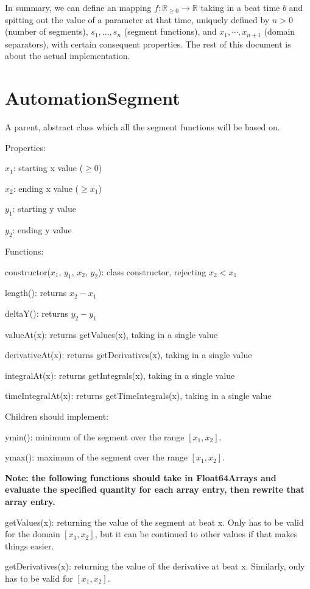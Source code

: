 \documentclass{article}
\begin{document}
In summary, we can define an mapping $f:\mathbb{R}_{\geq 0}\to \mathbb{R}$ taking in a beat time $b$ and spitting out the value of a parameter at that time, uniquely defined by $n>0$ (number of segments), $s_1, ..., s_n$ (segment functions), and $x_1, \cdots, x_{n+1}$ (domain separators), with certain consequent properties. The rest of this document is about the actual implementation.

\section{AutomationSegment}

A parent, abstract class which all the segment functions will be based on.

Properties:

$x_1$: starting x value ($\geq 0$)

$x_2$: ending x value ($\geq x_1$)

$y_1$: starting y value

$y_2$: ending y value

Functions:

constructor($x_1$, $y_1$, $x_2$, $y_2$): class constructor, rejecting $x_2 < x_1$

length(): returns $x_2 - x_1$

deltaY(): returns $y_2 - y_1$

valueAt(x): returns getValues(x), taking in a single value

derivativeAt(x): returns getDerivatives(x), taking in a single value

integralAt(x): returns getIntegrals(x), taking in a single value

timeIntegralAt(x): returns getTimeIntegrals(x), taking in a single value

Children should implement:

ymin(): minimum of the segment over the range $[x_1, x_2]$.

ymax(): maximum of the segment over the range $[x_1, x_2]$.

\textbf{Note: the following functions should take in Float64Arrays and evaluate the specified quantity for each array entry, then rewrite that array entry.}

getValues(x): returning the value of the segment at beat x. Only has to be valid for the domain $[x_1, x_2]$, but it can be continued to other values if that makes things easier.

getDerivatives(x): returning the value of the derivative at beat x. Similarly, only has to be valid for $[x_1, x_2]$.
\end{document}
